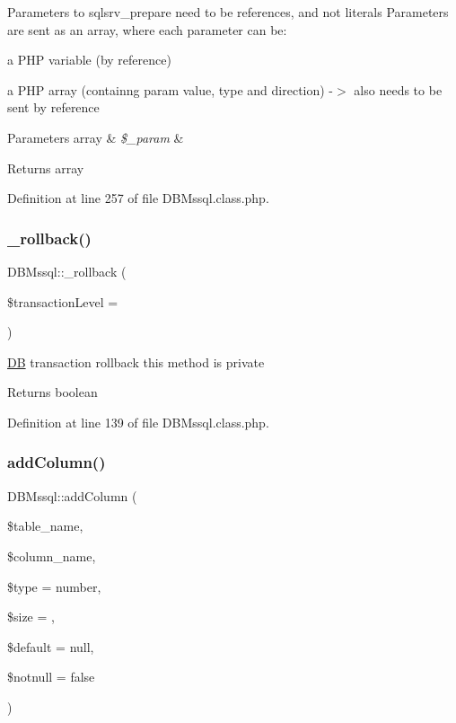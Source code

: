 Parameters to sqlsrv\+\_\+prepare need to be references, and not literals Parameters are sent as an array, where each parameter can be\+:
\begin{DoxyItemize}
\item a P\+HP variable (by reference)
\item a P\+HP array (containng param value, type and direction) -\/$>$ also needs to be sent by reference 
\begin{DoxyParams}[1]{Parameters}
array & {\em \$\+\_\+param} & \\
\hline
\end{DoxyParams}
\begin{DoxyReturn}{Returns}
array 
\end{DoxyReturn}

\end{DoxyItemize}

Definition at line 257 of file D\+B\+Mssql.\+class.\+php.

\mbox{\label{classDBMssql_a35fd47dce4ad5dabbc3b994f5774afb7}} 
\subsubsection{\texorpdfstring{\+\_\+rollback()}{\_rollback()}}
{\footnotesize\ttfamily D\+B\+Mssql\+::\+\_\+rollback (\begin{DoxyParamCaption}\item[{}]{\$transaction\+Level = {} }\end{DoxyParamCaption})}

\hyperlink{classDB}{DB} transaction rollback this method is private \begin{DoxyReturn}{Returns}
boolean 
\end{DoxyReturn}


Definition at line 139 of file D\+B\+Mssql.\+class.\+php.

\mbox{\label{classDBMssql_af9ca9b154ba965d089216bbc72f39a34}} 
\subsubsection{\texorpdfstring{add\+Column()}{addColumn()}}
{\footnotesize\ttfamily D\+B\+Mssql\+::add\+Column (\begin{DoxyParamCaption}\item[{}]{\$table\+\_\+name,  }\item[{}]{\$column\+\_\+name,  }\item[{}]{\$type = {\ttfamily \textquotesingle{}number\textquotesingle{}},  }\item[{}]{\$size = {\ttfamily \textquotesingle{}\textquotesingle{}},  }\item[{}]{\$default = {\ttfamily null},  }\item[{}]{\$notnull = {\ttfamily false} }\end{DoxyParamCaption})}

